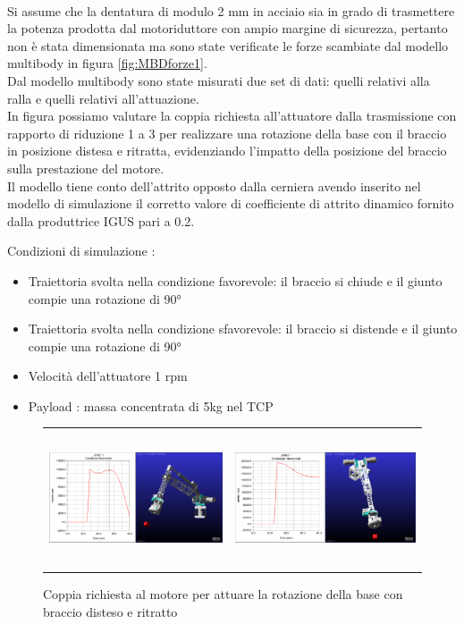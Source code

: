 \documentclass[%
corpo=11pt,
twoside,
 stile=classica,
oldstyle,
greek,%
]{toptesi}
\begin{document}
		\\
		Si assume che la dentatura di modulo 2 mm in acciaio sia in grado di trasmettere la potenza prodotta dal motoriduttore con ampio margine di sicurezza, pertanto non è stata dimensionata ma sono state verificate le forze scambiate dal modello multibody in figura \ref{fig:MBDforze1}. \\
		Dal modello multibody sono state misurati due set di dati: quelli relativi alla ralla e quelli relativi all'attuazione. \\
		In figura possiamo valutare la coppia richiesta all'attuatore dalla trasmissione con rapporto di riduzione 1 a 3 per realizzare una rotazione della base con il braccio in posizione distesa e ritratta, evidenziando l'impatto della posizione del braccio sulla prestazione del motore. \\
		Il modello tiene conto dell'attrito opposto dalla cerniera avendo inserito nel modello di simulazione il corretto valore di coefficiente di attrito dinamico fornito dalla produttrice IGUS pari a 0.2. 
		
		Condizioni di simulazione :
		\begin{itemize}
			\item Traiettoria svolta nella condizione favorevole: il braccio si chiude e il giunto compie una rotazione di 90° 
			\item Traiettoria svolta nella condizione sfavorevole: il braccio si distende e il giunto compie una rotazione di 90° 
			\item Velocità dell'attuatore 1 rpm
			\item Payload : massa concentrata di 5kg nel TCP 
		\end{itemize}

		\begin{figure} [!ht]
			\centering
			\begin{tabular}{ll}
				\includegraphics[height=4cm,keepaspectratio]{Plots/BASE/joint1_FAVOREVOLE.png}
				&
				\includegraphics[height=4cm,keepaspectratio]{Plots/BASE/joint1_sfavorevole.png}
			\end{tabular}
			\caption{Coppia richiesta al motore per attuare la rotazione della base con braccio disteso e ritratto}
			\label{fig:MBDcoppia1}
		\end{figure}
	
\end{document}
